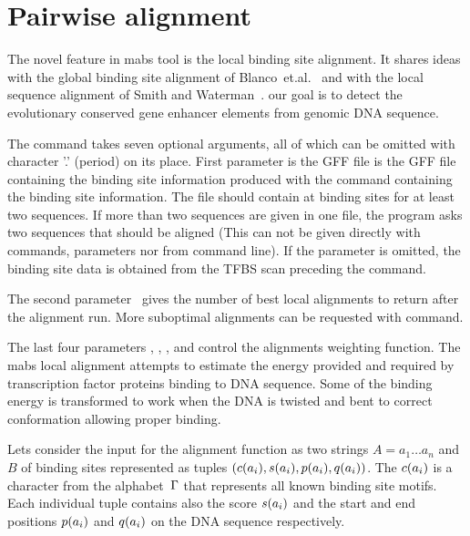 \section{Pairwise alignment}
\label{sec:pairalign}

The novel feature in mabs tool is the local binding site alignment. It
shares ideas with the global binding site
alignment of Blanco~et.al.~\cite{Blanco_etal03} and with the local
sequence alignment of Smith and Waterman~\cite{SmithWaterman81}. our
goal is to detect the evolutionary conserved gene enhancer elements
from genomic DNA sequence.

The  command takes seven optional arguments, all of
which can be omitted with character '.' (period) on its place. First
parameter  is the GFF file  is the GFF file containing the binding site
information produced with the
 command containing the binding site
information. The file should contain at binding sites for at least two
sequences. If more than two sequences are given in one file, the
program asks two sequences that should be aligned (This can not be
given directly with commands, parameters nor from command line). If
the  parameter is omitted, the binding site data is
obtained from the TFBS scan preceding the  command.

The second parameter~ gives the number of best local
alignments to return after the alignment run. More suboptimal
alignments can be requested with  command.

The last four parameters \mparam{$\lambda$}, \mparam{$\xi$},
\mparam{$\mu$}, \mparam{$\nu$} and  control the alignments
weighting function. The mabs local alignment attempts to estimate the
energy provided and required by transcription factor proteins binding
to DNA sequence. Some of the binding energy is transformed to work
when the DNA is twisted and bent to correct conformation allowing
proper binding.

Lets consider the input for the alignment function as two strings $A=a_1
\ldots a_n$ and~$B$ %
of binding sites represented as tuples $(c({a_i}), s({a_i}), p({a_i}),
q({a_i}))$. The $c({a_i})$ is a character from the
alphabet~$\Gamma$ that represents all
known binding site motifs.  Each individual tuple contains also the score
$s({a_i})$ and the start and end positions $p({a_i})$ and
$q({a_i})$ on the DNA sequence respectively. 


